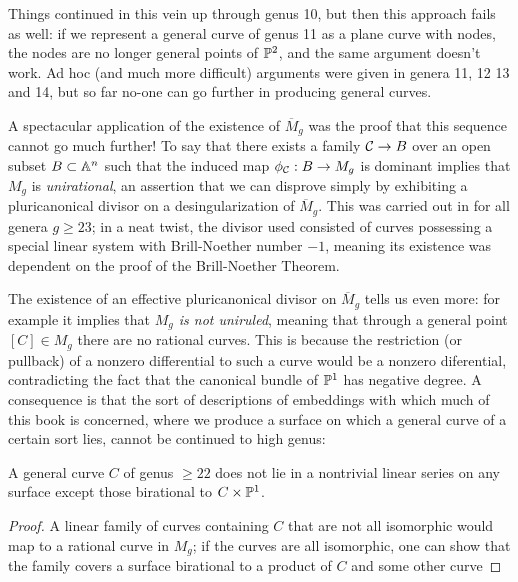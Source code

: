 Things continued in this vein up through genus 10, but then this approach fails as well: if we represent a general curve of genus 11 as a plane curve with nodes, the nodes are no longer general points of $\PP^2$, and the same argument doesn't work. Ad hoc (and much more difficult) arguments were given in genera 11, 12 13 and 14, but so far no-one can go further in producing general curves. 

A spectacular application of the existence of $\overline M_g$ was the proof that this sequence cannot go much further! To say that there exists a family $\cC \to B$ over an open subset $B \subset \AA^n$ such that the induced map $\phi_\cC : B \to M_g$ is dominant implies that $M_g$ is \emph{unirational}, an assertion that we can disprove simply by exhibiting a pluricanonical divisor on a desingularization of $\overline M_g$. This was carried out in  for all genera $g \geq 23$; in a neat twist, the divisor used consisted of curves possessing a special linear system with Brill-Noether number $-1$, meaning its existence was dependent on the proof of the Brill-Noether Theorem.

The existence of an effective pluricanonical divisor on $\overline M_g$ tells us even more: for example it implies that \emph{$M_g$ is not uniruled}, meaning that through a general point $[C] \in M_g$ there are no rational curves. This is because the restriction (or pullback) of a nonzero differential to such a curve would be a nonzero diferential, contradicting the fact that the canonical bundle of $\PP^1$ has  negative degree. A consequence is that the sort of descriptions of embeddings with which much of this book is concerned, where we produce a surface on which a general curve of a certain sort lies, cannot be continued to high genus:

\begin{corollary}
 A general curve $C$ of  genus $\geq 22$ does not lie in a nontrivial linear series on any surface
 except those birational to $C\times \PP^1$.
\end{corollary}
\begin{proof}
 A linear family of curves containing $C$ that are not all isomorphic would map to a rational curve in $M_g$; if the curves are all isomorphic, one can show that the family
 covers a surface birational to a product of $C$ and some other curve 
\end{proof}


